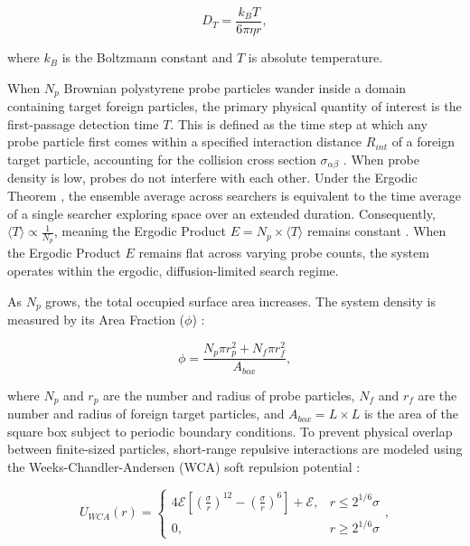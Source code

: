 \begin{equation}
    D_T = \frac{k_BT}{6\pi\eta r},
\label{eqn:1.7}
\end{equation}

\noindent where $k_B$ is the Boltzmann constant and $T$ is absolute temperature.

\hspace{\parindent} When $N_p$ Brownian polystyrene probe particles wander inside a domain containing target foreign particles, the primary physical quantity of interest is the first-passage detection time $T$. This is defined as the time step at which any probe particle first comes within a specified interaction distance $R_{int}$ of a foreign target particle, accounting for the collision cross section $\sigma_{\alpha \beta}$ \cite{Redner2001}. When probe density is low, probes do not interfere with each other. Under the Ergodic Theorem \cite{Zwanzig2001}, the ensemble average across searchers is equivalent to the time average of a single searcher exploring space over an extended duration. Consequently, $\langle T\rangle \propto \frac{1}{N_p}$, meaning the Ergodic Product $E = N_p \times \langle T \rangle$ remains constant \cite{Loverdo2008}. When the Ergodic Product $E$ remains flat across varying probe counts, the system operates within the ergodic, diffusion-limited search regime.

\hspace{\parindent} As $N_p$ grows, the total occupied surface area increases. The system density is measured by its Area Fraction ($\phi$) \cite{Balejado2026}:

\begin{equation}
    \phi = \frac{N_p \pi r_p^2 + N_f \pi r_f^2}{A_{box}},
\label{eqn:1.8}
\end{equation}

\noindent where $N_p$ and $r_p$ are the number and radius of probe particles, $N_f$ and $r_f$ are the number and radius of foreign target particles, and $A_{box} = L \times L$ is the area of the square box subject to periodic boundary conditions. To prevent physical overlap between finite-sized particles, short-range repulsive interactions are modeled using the Weeks-Chandler-Andersen (WCA) soft repulsion potential \cite{Weeks1971}:

\begin{equation}
    U_{WCA}(r) = \begin{cases}
        4\mathcal{E}\left[\left(\frac{\sigma}{r}\right)^12-\left(\frac{\sigma}{r}\right)^6\right] + \mathcal{E}, &r\leq2^{1/6}\sigma \\
        0, & r\geq 2^{1/6}\sigma
    \end{cases},
\label{eqn:1.9}
\end{equation}

